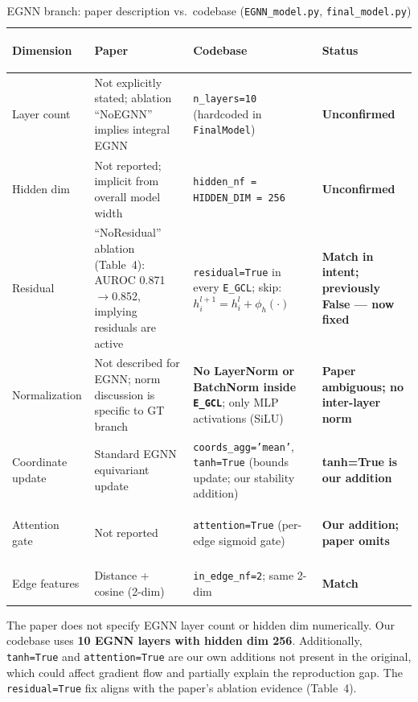 \documentclass[10pt, a4paper]{article}
\newcommand{\match}[1]{\textcolor{okgreen}{\textbf{#1}}}
\newcommand{\mismatch}[1]{\textcolor{warnorange}{\textbf{#1}}}
\newcommand{\warn}[1]{\textcolor{warnorange}{\textbf{#1}}}
\newcommand{\code}[1]{\texttt{\small #1}}
\begin{document}
\begin{table}[ht]
\caption{EGNN branch: paper description vs.\ codebase (\code{EGNN\_model.py}, \code{final\_model.py})}
\label{tab:egnn_compare}
\begin{tabularx}{\linewidth}{>{\footnotesize\bfseries\raggedright\arraybackslash}p{2.2cm} Y Y
    >{\footnotesize\centering\arraybackslash}p{2.8cm}}
\toprule
\normalsize\textbf{Dimension} & \normalsize\textbf{Paper} & \normalsize\textbf{Codebase} & \normalsize\textbf{Status} \\
\midrule
Layer count &
  Not explicitly stated; ablation ``NoEGNN'' implies integral EGNN &
  \code{n\_layers=10} (hardcoded in \code{FinalModel}) &
  \warn{Unconfirmed} \\
\addlinespace
Hidden dim &
  Not reported; implicit from overall model width &
  \code{hidden\_nf = HIDDEN\_DIM = 256} &
  \warn{Unconfirmed} \\
\addlinespace
Residual &
  ``NoResidual'' ablation (Table~4): AUROC 0.871$\to$0.852, implying residuals are active &
  \code{residual=True} in every \code{E\_GCL}; skip: $h_i^{l+1} = h_i^l + \phi_h(\cdot)$ &
  \match{Match in intent; previously False --- now fixed} \\
\addlinespace
Normalization &
  Not described for EGNN; norm discussion is specific to GT branch &
  \textbf{No LayerNorm or BatchNorm inside \code{E\_GCL}}; only MLP activations (SiLU) &
  \mismatch{Paper ambiguous; no inter-layer norm} \\
\addlinespace
Coordinate update &
  Standard EGNN equivariant update &
  \code{coords\_agg='mean'}, \code{tanh=True} (bounds update; our stability addition) &
  \mismatch{tanh=True is our addition} \\
\addlinespace
Attention gate &
  Not reported &
  \code{attention=True} (per-edge sigmoid gate) &
  \mismatch{Our addition; paper omits} \\
\addlinespace
Edge features &
  Distance + cosine (2-dim) &
  \code{in\_edge\_nf=2}; same 2-dim &
  \match{Match} \\
\bottomrule
\end{tabularx}
\end{table}

\begin{tcolorbox}[colback=warnbg, colframe=warnorange, title=\warn{EGNN Key Concern}]
The paper does not specify EGNN layer count or hidden dim numerically.
Our codebase uses \textbf{10 EGNN layers with hidden dim 256}.
Additionally, \code{tanh=True} and \code{attention=True} are our own additions not present in the
original, which could affect gradient flow and partially explain the reproduction gap.
The \code{residual=True} fix aligns with the paper's ablation evidence (Table~4).
\end{tcolorbox}
\end{document}
